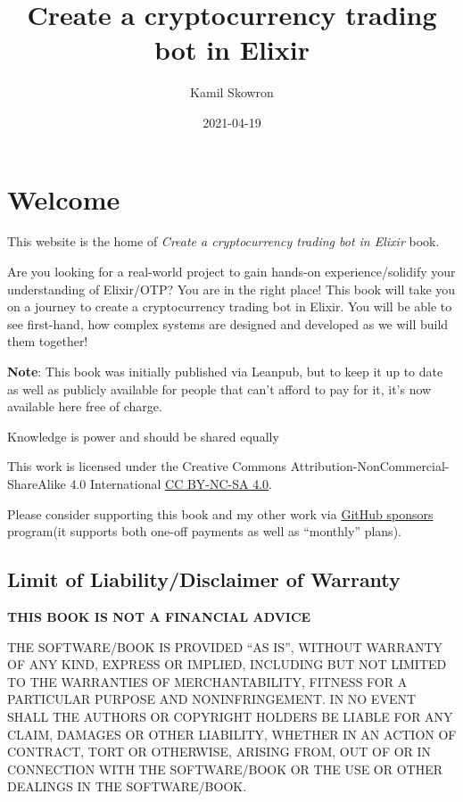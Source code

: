 \documentclass[
]{book}
\title{Create a cryptocurrency trading bot in Elixir}
\author{Kamil Skowron}
\date{2021-04-19}
\begin{document}
\maketitle

{
\setcounter{tocdepth}{1}
\tableofcontents
}
\hypertarget{welcome}{%
\chapter*{Welcome 👋}\label{welcome}}

This website is the home of \emph{Create a cryptocurrency trading bot in Elixir} book.

Are you looking for a real-world project to gain hands-on experience/solidify your understanding of Elixir/OTP? You are in the right place! This book will take you on a journey to create a cryptocurrency trading bot in Elixir. You will be able to see first-hand, how complex systems are designed and developed as we will build them together!

\textbf{Note}: This book was initially published via Leanpub, but to keep it up to date as well as publicly available for people that can't afford to pay for it, it's now available here free of charge.

Knowledge is power and should be shared equally 🙏

This work is licensed under the Creative Commons Attribution-NonCommercial-ShareAlike 4.0 International \href{https://creativecommons.org/licenses/by-nc-sa/4.0/}{CC BY-NC-SA 4.0}.

Please consider supporting this book and my other work via \href{https://github.com/sponsors/frathon}{GitHub sponsors} program(it supports both one-off payments as well as ``monthly'' plans).

\hypertarget{limit-of-liabilitydisclaimer-of-warranty}{%
\section*{Limit of Liability/Disclaimer of Warranty}\label{limit-of-liabilitydisclaimer-of-warranty}}

\textbf{THIS BOOK IS NOT A FINANCIAL ADVICE}

THE SOFTWARE/BOOK IS PROVIDED ``AS IS'', WITHOUT WARRANTY OF ANY KIND, EXPRESS OR IMPLIED, INCLUDING BUT NOT LIMITED TO THE WARRANTIES OF MERCHANTABILITY, FITNESS FOR A PARTICULAR PURPOSE AND NONINFRINGEMENT. IN NO EVENT SHALL THE AUTHORS OR COPYRIGHT HOLDERS BE LIABLE FOR ANY CLAIM, DAMAGES OR OTHER LIABILITY, WHETHER IN AN ACTION OF CONTRACT, TORT OR OTHERWISE, ARISING FROM, OUT OF OR IN CONNECTION WITH THE SOFTWARE/BOOK OR THE USE OR OTHER DEALINGS IN THE SOFTWARE/BOOK.
\end{document}

